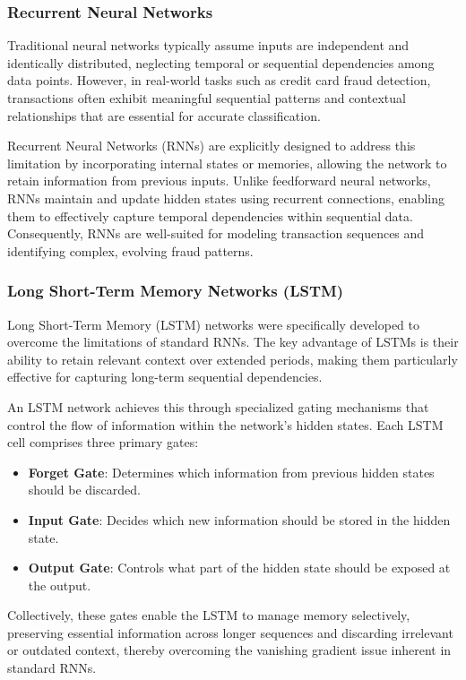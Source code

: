 \subsubsection{Recurrent Neural Networks}
Traditional neural networks typically assume inputs are independent and identically distributed, neglecting temporal or sequential dependencies among data points. However, in real-world tasks such as credit card fraud detection, transactions often exhibit meaningful sequential patterns and contextual relationships that are essential for accurate classification.

Recurrent Neural Networks (RNNs)\cite{rumelhart1985learning} are explicitly designed to address this limitation by incorporating internal states or memories, allowing the network to retain information from previous inputs. Unlike feedforward neural networks, RNNs maintain and update hidden states using recurrent connections, enabling them to effectively capture temporal dependencies within sequential data. Consequently, RNNs are well-suited for modeling transaction sequences and identifying complex, evolving fraud patterns.

\subsubsection{Long Short-Term Memory Networks (LSTM)}
Long Short-Term Memory (LSTM)\cite{6795963} networks were specifically developed to overcome the limitations of standard RNNs. The key advantage of LSTMs is their ability to retain relevant context over extended periods, making them particularly effective for capturing long-term sequential dependencies.

An LSTM network achieves this through specialized gating mechanisms that control the flow of information within the network's hidden states. Each LSTM cell comprises three primary gates:

\begin{itemize}
    \item \textbf{Forget Gate}: Determines which information from previous hidden states should be discarded.
    \item \textbf{Input Gate}: Decides which new information should be stored in the hidden state.
    \item \textbf{Output Gate}: Controls what part of the hidden state should be exposed at the output.
\end{itemize}

Collectively, these gates enable the LSTM to manage memory selectively, preserving essential information across longer sequences and discarding irrelevant or outdated context, thereby overcoming the vanishing gradient issue inherent in standard RNNs.

